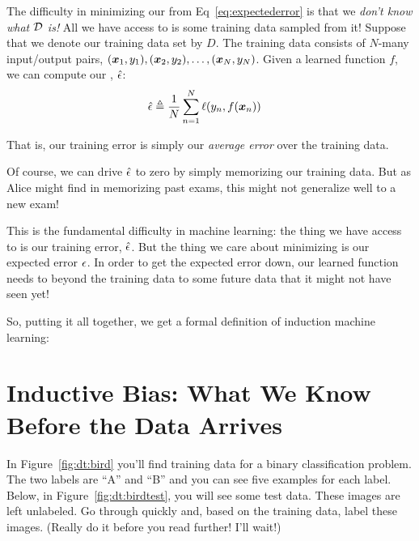 The difficulty in minimizing our  from
Eq~\eqref{eq:expectederror} is that we \emph{don't know what $\mathcal{D}$
  is!}  All we have access to is some training data sampled from it!
Suppose that we denote our training data set by $D$.  The training
data consists of $N$-many input/output pairs, $({\boldsymbol{x}}_1,y_1),
({\boldsymbol{x}}_2,y_2), \dots, ({\boldsymbol{x}}_N,y_N)$.  Given a learned function $f$, we
can compute our , $\hat {\epsilon}$:
\begin{align} \label{eq:trainingerror}
\hat {\epsilon}
&\triangleq
\frac 1 N \sum_{n=1}^N \ell(y_n, f({\boldsymbol{x}}_n))
\end{align}

That is, our training error is simply our \emph{average error} over
the training data.  

Of course, we can drive $\hat {\epsilon}$ to zero by simply memorizing our
training data.  But as Alice might find in memorizing past exams, this
might not generalize well to a new exam!

This is the fundamental difficulty in machine learning: the thing we
have access to is our training error, $\hat {\epsilon}$.  But the thing we care
about minimizing is our expected error $\epsilon$.  In order to get the
expected error down, our learned function needs to
 beyond the training data to some future data that
it might not have seen yet!

So, putting it all together, we get a formal definition of induction
machine learning: 


\section{Inductive Bias: What We Know Before the Data Arrives}



In Figure~\ref{fig:dt:bird} you'll find training data for a binary
classification problem.  The two labels are ``A'' and ``B'' and you
can see five examples for each label.  Below, in
Figure~\ref{fig:dt:birdtest}, you will see some test data.  These
images are left unlabeled.  Go through quickly and, based on the
training data, label these images.  (Really do it before you read
further!  I'll wait!)

